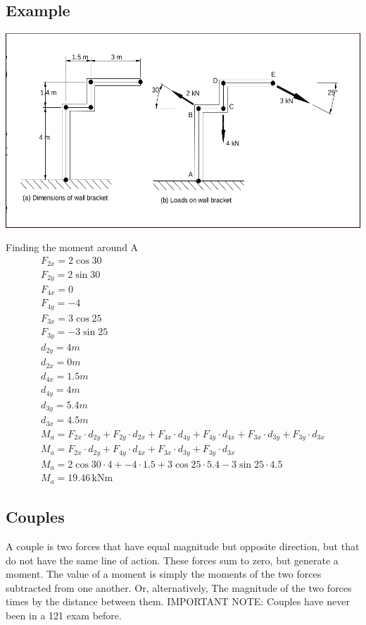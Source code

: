 \documentclass[a4paper, 12pt]{article}
\newcommand{\unit}[1]{\ensuremath{\, \mathrm{#1}}}
\begin{document}
\subsection{Example}
\includegraphics[scale=0.2]{topic-3}

Finding the moment around A
\begin{gather*}
    F_{2x} = 2\cos{30} \\ 
    F_{2y} = 2\sin{30} \\
    F_{4x} = 0 \\ 
    F_{4y} = -4 \\
    F_{3x} = 3\cos{25} \\
    F_{3y} = -3\sin{25} \\
    d_{2y} = 4m \\
    d_{2x} = 0m \\
    d_{4x} = 1.5m \\
    d_{4y} = 4m \\
    d_{3y} = 5.4m \\
    d_{3x} = 4.5m \\
    M_a = F_{2x} \cdot d_{2y} + F_{2y} \cdot d_{2x} + F_{4x} \cdot d_{4y} + F_{4y} \cdot d_{4x} + F_{3x} \cdot d_{3y} + F_{3y} \cdot d_{3x} \\
    M_a = F_{2x} \cdot d_{2y} + F_{4y} \cdot d_{4x} + F_{3x} \cdot d_{3y} + F_{3y} \cdot d_{3x} \\
    M_a = 2\cos{30} \cdot 4 + -4 \cdot 1.5 + 3\cos{25} \cdot 5.4 - 3\sin{25} \cdot 4.5 \\ 
    M_a = 19.46 \unit{kNm}
\end{gather*}
\subsection{Couples}
A couple is two forces that have equal magnitude but opposite direction, but that do not have the same line of action.
These forces sum to zero, but generate a moment. The value of a moment is simply the moments of the two forces subtracted from one another.
Or, alternatively, The magnitude of the two forces times by the distance between them. IMPORTANT NOTE: Couples have never been in a 121 exam before.
\end{document}
